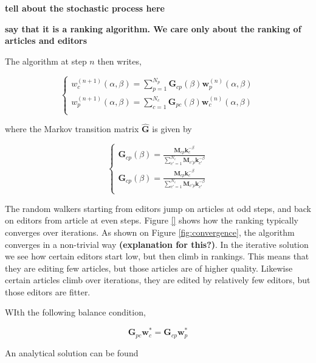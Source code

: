 {\bf tell about the stochastic process here} \cite{caldarelli2012network}

{\bf say that it is a ranking algorithm. We care only about the ranking of articles and editors}

The algorithm at step $n$ then writes,

\begin{equation}
\begin{cases}
 w^{(n+1)}_c (\alpha,\beta) = \sum_{p=1}^{N_p}  \mathbf{G}_{cp}(\beta) \mathbf{w}^{(n)}_p (\alpha,\beta)\\
w^{(n+1)}_p (\alpha,\beta) = \sum_{c=1}^{N_c}  \mathbf{G}_{pc}(\beta) \mathbf{w}^{(n)}_c (\alpha,\beta)\\
\end{cases}
\end{equation}

where the Markov transition matrix $\mathbf{\hat{G}}$ is given by 

\begin{equation}
\begin{cases}
\mathbf{G}_{cp}(\beta) = \frac{\mathbf{M}_{cp} \mathbf{k}_{c}^{-\beta}}{\sum_{c' = 1}^{N_c} \mathbf{M}_{c'p} \mathbf{k}_{c'}^{-\beta}}\\
\mathbf{G}_{cp}(\beta) = \frac{\mathbf{M}_{cp} \mathbf{k}_{c}^{-\beta}}{\sum_{c' = 1}^{N_c} \mathbf{M}_{c'p} \mathbf{k}_{c'}^{-\beta}}\\
 \end{cases}
\end{equation}

The random walkers starting from editors jump on articles at odd steps, and back on editors from article at even steps. Figure \ref{} shows how the ranking typically converges over iterations. As shown on Figure \ref{fig:convergence}, the algorithm converges in a non-trivial way {\bf (explanation for this?)}. In the iterative solution we see how certain editors start low, but then climb in rankings. This means that they are editing few articles, but those articles are of higher quality. Likewise certain articles climb over iterations, they are edited by relatively few editors, but those editors are fitter.

WIth the following balance condition,

\begin{equation}
\mathbf{G}_{pc} \mathbf{w}^*_c = \mathbf{G}_{cp} \mathbf{w}^*_p
\end{equation}

An analytical solution can be found \cite{caldarelli}

